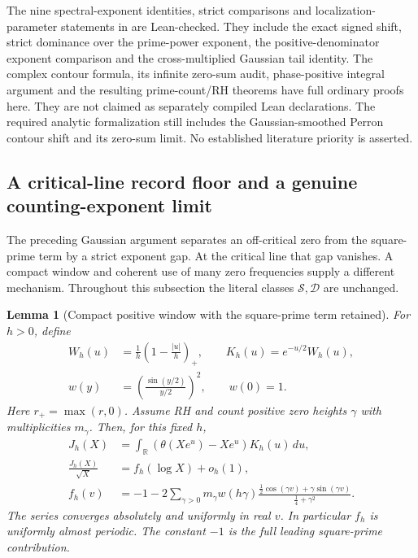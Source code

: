 \documentclass[11pt]{article}
\newtheorem{lemma}[theorem]{Lemma}
\theoremstyle{definition}
\begin{document}
The nine spectral-exponent identities, strict comparisons and
localization-parameter statements in
are Lean-checked.
They include the exact signed shift, strict dominance over the
prime-power exponent, the positive-denominator exponent comparison
and the cross-multiplied Gaussian tail identity.
The complex contour formula, its infinite zero-sum audit,
phase-positive integral argument and the resulting prime-count/RH
theorems have full ordinary proofs here.
They are not claimed as separately compiled Lean declarations.
The required analytic formalization still includes the
Gaussian-smoothed Perron contour shift and its zero-sum limit.
No established literature priority is asserted.

\subsection{A critical-line record floor and a genuine counting-exponent limit}
\label{sec:greedy-prime-critical-record-floor}

The preceding Gaussian argument separates an off-critical zero from the
square-prime term by a strict exponent gap. At the critical line that gap
vanishes. A compact window and coherent use of many zero frequencies
supply a different mechanism. Throughout this subsection the literal
classes $\mathcal S,\mathcal D$ are unchanged.

\begin{lemma}[Compact positive window with the square-prime term retained]
\label{lem:greedy-prime-compact-critical-profile}
For $h>0$, define
\[
 \begin{aligned}
 W_h(u)&=\frac1h\left(1-\frac{|u|}{h}\right)_+,\qquad
 K_h(u)=e^{-u/2}W_h(u),\\
 w(y)&=\left(\frac{\sin(y/2)}{y/2}\right)^2,\qquad w(0)=1.
 \end{aligned}
\]
Here $r_+=\max(r,0)$.
Assume RH and count positive zero heights $\gamma$ with multiplicities
$m_\gamma$. Then, for this fixed $h$,
\begin{equation}
 \begin{aligned}
 J_h(X)&=\int_{\mathbb R}(\theta(Xe^u)-Xe^u)K_h(u)\,du,\\
 \frac{J_h(X)}{\sqrt X}&=f_h(\log X)+o_h(1),\\
 f_h(v)&=-1-2\sum_{\gamma>0}
 m_\gamma w(h\gamma)
 \frac{\tfrac12\cos(\gamma v)+\gamma\sin(\gamma v)}
      {\tfrac14+\gamma^2}.
 \end{aligned}
 \label{eq:greedy-prime-compact-critical-profile}
\end{equation}
The series converges absolutely and uniformly in real $v$.
In particular $f_h$ is uniformly almost periodic.
The constant $-1$ is the full leading square-prime contribution.
\end{lemma}
\end{document}
